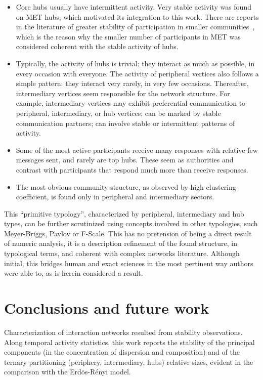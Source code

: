 \documentclass[%
 aip,
 jmp,%
 amsmath,amssymb,
 reprint,%
]{revtex4-1}
\begin{document}
\begin{itemize}
    \item Core hubs usually have intermittent activity. Very stable activity was found on MET hubs, which motivated its integration to this work. There are reports in the literature of greater stability of participation in smaller communities~\cite{barabasiEvo}, which is the reason why the smaller number of participants in MET was considered coherent with the stable activity of hubs.
    \item Typically, the activity of hubs is trivial: they interact as much as possible, in every occasion with everyone. The activity of peripheral vertices also follows a simple pattern: they interact very rarely, in very few occasions. Thereafter, intermediary vertices seem responsible for the network structure. For example, intermediary vertices may exhibit preferential communication to peripheral, intermediary, or hub vertices; can be marked by stable communication partners; can involve stable or intermittent patterns of activity.
    \item Some of the most active participants receive many responses with relative few messages sent, and rarely are top hubs. These seem as authorities and contrast with participants that respond much more than receive responses.
    \item The most obvious community structure, as observed by high clustering coefficient, is found only in peripheral and intermediary sectors.
\end{itemize}


This ``primitive typology'', characterized by peripheral, intermediary and hub types, can be further scrutinized using concepts involved in other typologies, such Meyer-Briggs, Pavlov or F-Scale. This has no pretension of being a direct result of numeric analysis, it is a description refinement of the found structure, in typological terms, and coherent with complex networks literature. Although initial, this bridges human and exact sciences in the most pertinent way authors were able to, as is herein considered a result.
 
\section{Conclusions and future work}
Characterization of interaction networks resulted from stability observations. Along temporal activity statistics, this work reports the stability of the principal components (in the concentration of dispersion and composition) and of the ternary partitioning (periphery, intermediary, hubs) relative sizes, evident in the comparison with the Erd\"os-R\'enyi model.
\end{document}
